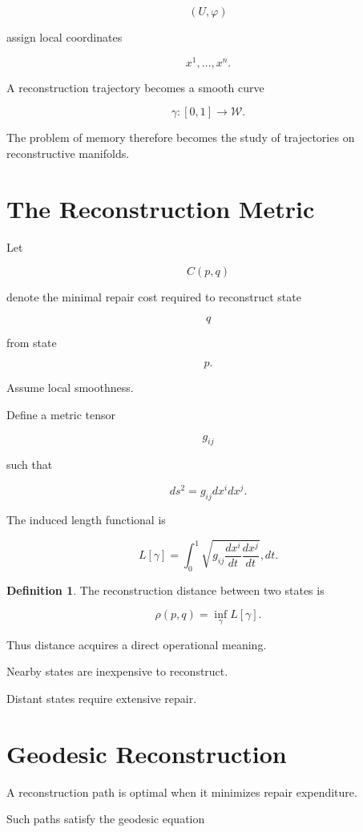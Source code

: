 \documentclass[12pt,oneside]{book}
\theoremstyle{plain} \newtheorem{theorem}{Theorem}[chapter] \newtheorem{lemma}[theorem]{Lemma} \newtheorem{proposition}[theorem]{Proposition} \newtheorem{corollary}[theorem]{Corollary}
\theoremstyle{definition} \newtheorem{definition}[theorem]{Definition} \newtheorem{axiom}[theorem]{Axiom} \newtheorem{construction}[theorem]{Construction}
\theoremstyle{remark} \newtheorem{remark}[theorem]{Remark} \newtheorem{example}[theorem]{Example}
\begin{document}
\[
(U,\varphi)
\]

assign local coordinates

\[
x^1,\ldots,x^n.
\]

A reconstruction trajectory becomes a smooth curve

\[
\gamma:[0,1]\rightarrow\mathcal W.
\]

The problem of memory therefore becomes the study of trajectories on reconstructive manifolds.

\section{The Reconstruction Metric}

Let

\[
C(p,q)
\]

denote the minimal repair cost required to reconstruct state

\[
q
\]

from state

\[
p.
\]

Assume local smoothness.

Define a metric tensor

\[
g_{ij}
\]

such that

\[
ds^2
=
g_{ij}
dx^i
dx^j.
\]

The induced length functional is

\[
L[\gamma]
=
\int_0^1
\sqrt{
g_{ij}
\frac{dx^i}{dt}
\frac{dx^j}{dt}
}
,dt.
\]

\begin{definition}

The reconstruction distance between two states is

\[
\rho(p,q)
=
\inf_\gamma
L[\gamma].
\]

\end{definition}

Thus distance acquires a direct operational meaning.

Nearby states are inexpensive to reconstruct.

Distant states require extensive repair.

\section{Geodesic Reconstruction}

A reconstruction path is optimal when it minimizes repair expenditure.

Such paths satisfy the geodesic equation
\end{document}
